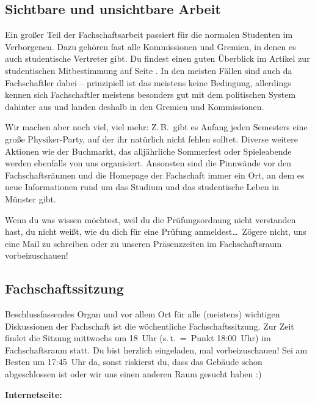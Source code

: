 \begin{multicols}{2}
\subsection*{Sichtbare und unsichtbare Arbeit}
Ein großer Teil der Fachschaftsarbeit passiert für die normalen Studenten im Verborgenen.
Dazu gehören fast alle Kommissionen und Gremien, in denen es auch studentische Vertreter gibt.
Du findest einen guten Überblick im Artikel zur studentischen Mitbestimmung auf Seite \pageref{studmit}.
In den meisten Fällen sind auch da Fachschaftler dabei -- prinzipiell ist das meistens keine Bedingung, allerdings kennen sich Fachschaftler meistens besonders gut mit dem politischen System dahinter aus und landen deshalb in den Gremien und Kommissionen.

Wir machen aber noch viel, viel mehr: Z.\,B.\ gibt es Anfang jeden Semesters eine große Physiker-Party, auf der ihr natürlich nicht fehlen solltet.
Diverse weitere Aktionen wie der Buchmarkt, das alljährliche Sommerfest oder Spieleabende werden ebenfalls von uns organisiert.
Ansonsten sind die Pinnwände vor den Fachschaftsräumen und die Homepage der Fachschaft immer ein Ort, an dem es neue Informationen rund um das Studium und das studentische Leben in Münster gibt.

Wenn du was wissen möchtest, weil du die Prüfungsordnung nicht verstanden hast, du nicht weißt, wie du dich für eine Prüfung anmeldest\dots\
Zögere nicht, uns eine Mail zu schreiben oder zu unseren Präsenzzeiten im Fachschaftsraum vorbeizuschauen!

\subsection*{Fachschaftssitzung}
Beschlussfassendes Organ und vor allem Ort für alle (meistens) wichtigen Diskussionen  der Fachschaft ist die wöchentliche Fachschaftssitzung.
Zur Zeit findet die Sitzung mittwochs um 18~Uhr (s.\,t.~=~Punkt 18:00~Uhr) im Fachschaftsraum statt.
Du bist herzlich eingeladen, mal vorbeizuschauen! Sei am Besten um 17:45~Uhr da, sonst riskierst du, dass das Gebäude schon abgeschlossen ist oder wir uns einen anderen Raum gesucht haben :)

\begin{minipage}{\columnwidth}
	\begin{minipage}[t]{5cm}
		\raggedright\parskip=0.1cm
		\textbf{Internetseite:}
	

\end{minipage}
\end{minipage}
\end{multicols}
